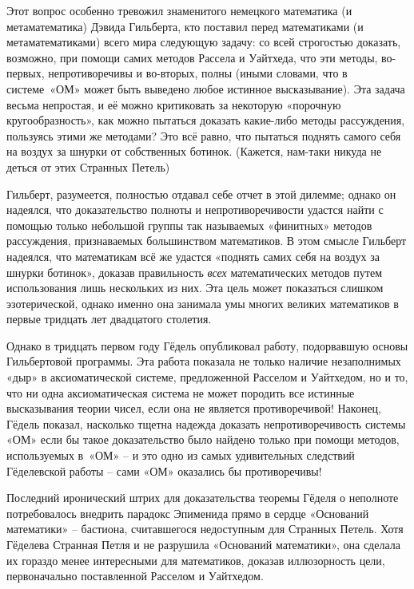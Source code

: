 \documentclass[../main.tex]{subfiles}
\begin{document}
Этот вопрос особенно тревожил знаменитого немецкого математика (и метаматематика) Дэвида Гильберта, кто поставил перед математиками (и метаматематиками) всего мира следующую задачу: со всей строгостью доказать, возможно, при помощи самих методов Рассела и Уайтхеда, что эти методы, во-первых, непротиворечивы и во-вторых, полны (иными словами, что в системе~«ОМ» может быть выведено любое истинное высказывание). Эта задача весьма непростая, и её можно критиковать за некоторую «порочную кругообразность», как можно пытаться доказать какие-либо методы рассуждения, пользуясь этими же методами? Это всё равно, что пытаться поднять самого себя на воздух за шнурки от собственных ботинок. (Кажется, нам-таки никуда не деться от этих Странных Петель)

Гильберт, разумеется, полностью отдавал себе отчет в этой дилемме; однако он надеялся, что доказательство полноты и непротиворечивости удастся найти с помощью только небольшой группы так называемых «финитных» методов рассуждения, признаваемых большинством математиков. В этом смысле Гильберт надеялся, что математикам всё же удастся «поднять самих себя на воздух за шнурки ботинок», доказав правильность \emph{всех} математических методов путем использования лишь нескольких из них. Эта цель может показаться слишком эзотерической, однако именно она занимала умы многих великих математиков в первые тридцать лет двадцатого столетия.

Однако в тридцать первом году Гёдель опубликовал работу, подорвавшую основы Гильбертовой программы. Эта работа показала не только наличие незаполнимых «дыр» в аксиоматической системе, предложенной Расселом и Уайтхедом, но и то, что ни одна аксиоматическая система не может породить все истинные высказывания теории чисел, если она не является противоречивой! Наконец, Гёдель показал, насколько тщетна надежда доказать непротиворечивость системы «ОМ» если бы такое доказательство было найдено только при помощи методов, используемых в~«ОМ» \--- и это одно из самых удивительных следствий Гёделевской работы \--- сами «ОМ» оказались бы противоречивы!

Последний иронический штрих для доказательства теоремы Гёделя о неполноте потребовалось внедрить парадокс Эпименида прямо в сердце «Оснований математики» \--- бастиона, считавшегося недоступным для Странных Петель. Хотя Гёделева Странная Петля и не разрушила «Оснований математики», она сделала их гораздо менее интересными для математиков, доказав иллюзорность цели, первоначально поставленной Расселом и Уайтхедом.
\end{document}
